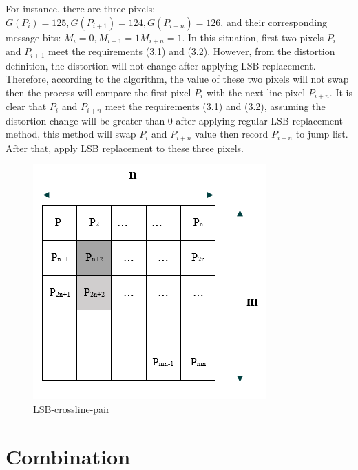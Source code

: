 For instance, there are three pixels: \(G(P_{i}) = 125, G(P_{i+1}) = 124, G(P_{i+n}) = 126\), and their corresponding message bits: \(M_{i} = 0, M_{i+1} = 1 M_{i+n} = 1\). In this situation, first two pixels \(P_{i}\) and \(P_{i+1}\) meet the requirements (3.1) and (3.2). However, from the distortion definition, the distortion will not change after applying LSB replacement. Therefore, according to the algorithm, the value of these two pixels will not swap then the process will compare the first pixel \(P_{i}\) with the next line pixel \(P_{i+n}\). It is clear that \(P_{i}\) and \(P_{i+n}\) meet the requirements (3.1) and (3.2), assuming the distortion change will be greater than 0 after applying regular LSB replacement method, this method will swap \(P_{i}\) and \(P_{i+n}\) value then record \(P_{i+n}\) to jump list. After that, apply LSB replacement to these three pixels.

\begin{figure}[h]
\includegraphics[width=\columnwidth]{image/LSB-crossline-pair.PNG}
\caption{LSB-crossline-pair}
\label{fig:figure}
\end{figure}   




\section{\label{sec:level1}Combination}

